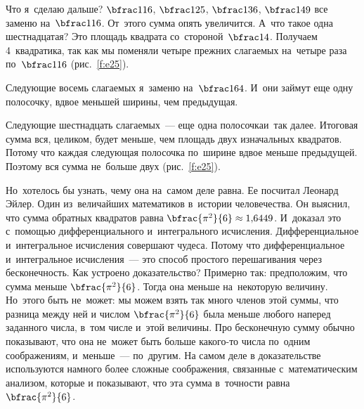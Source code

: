 Что я~сделаю дальше? $\bfrac1{16}$, $\bfrac1{25}$, $\bfrac1{36}$, $\bfrac1{49}$ все заменю
на~$\bfrac1{16}$. От~этого сумма опять увеличится. А~что такое одна шестнадцатая? Это площадь
квадрата со~стороной~$\bfrac14$. Получаем 4~квадратика, так как мы поменяли четыре прежних слагаемых
на~четыре раза по~$\bfrac1{16}$ (рис.~\ref{f:e25}).

\pagebreak



Следующие восемь слагаемых я~заменю на~$\bfrac1{64}$. И~они займут еще одну полосочку, вдвое меньшей ширины,
чем предыдущая.


Следующие шестнадцать слагаемых~--- еще одна полосочка\linebreak и~так далее. Итоговая сумма вся, целиком,
будет меньше, чем площадь двух изначальных квадратов. Потому что каждая следующая полосочка
по~ширине вдвое меньше предыдущей. Поэтому вся сумма не~больше двух (рис.~\ref{f:e25}).

Но~хотелось бы узнать, чему она на~самом деле равна. Ее посчитал Леонард Эйлер. Один из~величайших
математиков в~истории человечества. Он выяснил, что сумма обратных квадратов равна $\bfrac{\pi^{2}}{6} \approx 1{,}6449$.
И~доказал это с~помощью дифференциального и~интегрального исчисления. Дифференциальное
и~интегральное исчисления совершают чудеса. Потому что дифференциальное и~интегральное
исчисления~--- это способ простого перешагивания через бесконечность. Как устроено доказательство?
Примерно так: предположим, что сумма меньше $\bfrac{\pi^{2}}{6}$. Тогда она меньше на~некоторую величину. Но~этого быть не~может:
мы можем взять так много членов этой суммы, что разница между ней и числом $\bfrac{\pi^{2}}{6}$ была меньше любого наперед заданного числа,
в~том числе и~этой величины.
 Про бесконечную сумму обычно показывают, что она не~может быть больше
какого-то числа по~одним соображениям, и~меньше~--- по~другим. На самом деле в доказательстве используются намного
более сложные соображения, связанные с~математическим анализом, которые и показывают, что эта сумма в~точности равна $\bfrac{\pi^{2}}{6}$.


